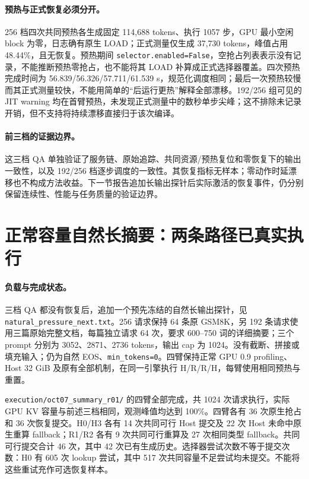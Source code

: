 \documentclass[UTF8,fontset=fandol,a4paper,10pt]{ctexart}
\newcommand{\code}[1]{\nolinkurl{#1}}
\begin{document}
\paragraph{预热与正式恢复必须分开。}
256 档四次共同预热各生成固定 114,688 tokens、执行 1057 步，GPU 最小空闲 block 为零，日志确有原生 LOAD；正式测量仅生成 37,730 tokens，峰值占用 48.44\%，且无恢复。预热期间 \code{selector.enabled=False}，空抢占列表表示没有记录，不能推断预热零抢占，也不能将其 LOAD 补算成正式选择器覆盖。四次预热完成时间为 56.839/56.326/57.711/61.539 s，规范化调度相同；最后一次预热较慢而其正式测量较快，不能用简单的“后运行更热”解释全部漂移。192/256 组可见的 JIT warning 均在首臂预热，未发现正式测量中的数秒单步尖峰；这不排除未记录开销，但不支持将持续漂移直接归于该次编译。

\paragraph{前三档的证据边界。}
这三档 QA 单独验证了服务链、原始追踪、共同资源/预热复位和零恢复下的输出一致性，以及 192/256 档逐步调度的一致性。其恢复指标无样本；零动作时延漂移也不构成方法收益。下一节报告追加长输出探针后实际激活的恢复事件，仍分别保留连续性、性能与任务质量的验证边界。

\section{正常容量自然长摘要：两条路径已真实执行}
\label{sec:summaryresults}
\paragraph{负载与完成状态。}
三档 QA 都没有恢复后，追加一个预先冻结的自然长输出探针，见\code{natural_pressure_next.txt}。256 请求保持 64 条原 GSM8K，另 192 条请求使用三篇原始完整文档，每篇独立请求 64 次，要求 600--750 词的详细摘要；三个 prompt 分别为 3052、2871、2736 tokens，输出 cap 为 1024。没有截断、拼接或填充输入；仍为自然 EOS、\code{min_tokens=0}。四臂保持正常 GPU 0.9 profiling、Host 32 GiB 及原有全部机制，在同一引擎执行 H/R/R/H，每臂使用相同预热与重置。

\code{execution/oct07_summary_r01/} 的四臂全部完成，共 1024 次请求执行，实际 GPU KV 容量与前述三档相同，观测峰值均达到 100\%。四臂各有 36 次原生抢占和 36 次恢复提交。H0/H3 各有 14 次共同可行 Host 提交及 22 次 Host 未命中原生重算 fallback；R1/R2 各有 9 次共同可行重算及 27 次相同类型 fallback。共同可行提交合计 46 次，其中 42 次已有生成历史。选择器尝试次数不等于提交次数：H0 有 605 次 lookup 尝试，其中 517 次共同容量不足尝试均未提交。不能将这些重试充作可选恢复样本。
\end{document}
